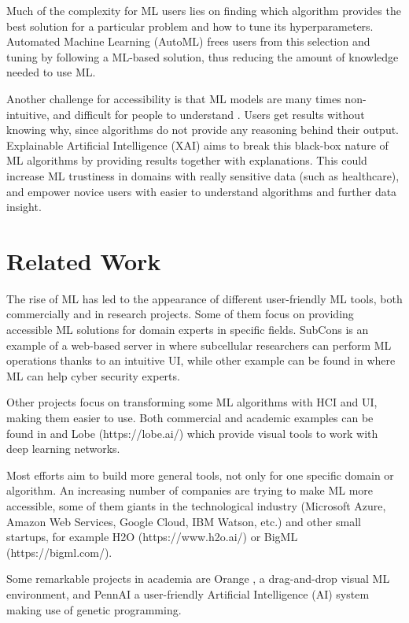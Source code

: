 \documentclass[runningheads]{llncs}
\begin{document}
Much of the complexity for ML users lies on finding which algorithm provides the best solution for a particular problem and how to tune its hyperparameters. Automated Machine Learning (AutoML) frees users from this selection and tuning \cite{automl} by following a ML-based solution, thus reducing the amount of knowledge needed to use ML.

Another challenge for accessibility is that ML models are many times non-intuitive, and difficult for people to understand \cite{xai}. Users get results without knowing why, since algorithms do not provide any reasoning behind their output. Explainable Artificial Intelligence (XAI) aims to break this black-box nature of ML algorithms by providing results together with explanations. This could increase ML trustiness in domains with really sensitive data (such as healthcare), and empower novice users with easier to understand algorithms and further data insight.

\section{Related Work}

The rise of ML has led to the appearance of different user-friendly ML tools, both commercially and in research projects. Some of them focus on providing accessible ML solutions for domain experts in specific fields. SubCons \cite{subcons} is an example of a web-based server in where subcellular researchers can perform ML operations thanks to an intuitive UI, while other example can be found in \cite{cyber} where ML can help cyber security experts.

Other projects focus on transforming some ML algorithms with HCI and UI, making them easier to use. Both commercial and academic examples can be found in \cite{Barista} and Lobe (https://lobe.ai/) which provide visual tools to work with deep learning networks.

Most efforts aim to build more general tools, not only for one specific domain or algorithm. An increasing number of companies are trying to make ML more accessible, some of them giants in the technological industry (Microsoft Azure, Amazon Web Services, Google Cloud, IBM Watson, etc.) and other small startups, for example H2O (https://www.h2o.ai/) or BigML (https://bigml.com/).

Some remarkable projects in academia are Orange \cite{orange}, a drag-and-drop visual ML environment, and PennAI \cite{pennAI} a user-friendly Artificial Intelligence (AI) system making use of genetic programming.
\end{document}

